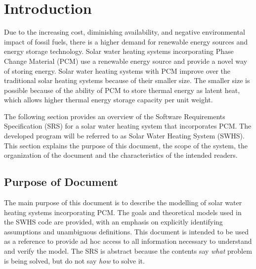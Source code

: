 \documentclass[12pt]{article}
\newcommand{\progname}{SWHS}
\begin{document}
\section{Introduction}

Due to the increasing cost, diminishing availability, and negative environmental
impact of fossil fuels, there is a higher demand for renewable energy sources
and energy storage technology.  Solar water heating systems incorporating Phase
Change Material (PCM) use a renewable energy source and provide a novel way of
storing energy.  Solar water heating systems with PCM improve over the
traditional solar heating systems because of their smaller size.  The smaller
size is possible because of the ability of PCM to store thermal energy as latent
heat, which allows higher thermal energy storage capacity per unit weight.





The following section provides an overview of the Software Requirements
Specification (SRS) for a solar water heating system that incorporates PCM.  The
developed program will be referred to as Solar Water Heating System 
(\progname{}).  This section explains the purpose of this document, the scope 
of the system, the organization of the document and the characteristics of the 
intended readers.

\subsection{Purpose of Document}

The main purpose of this document is to describe the modelling of solar water
heating systems incorporating PCM.  The goals and theoretical models used in the 
\progname{} code are provided, with an emphasis on explicitly identifying 
assumptions and unambiguous definitions.  This document is intended to be used 
as a reference to provide ad hoc access to all information necessary to 
understand and verify the model.  The SRS is abstract because the contents say
\emph{what} problem is being solved, but do not say \emph{how} to solve it.
\end{document}
